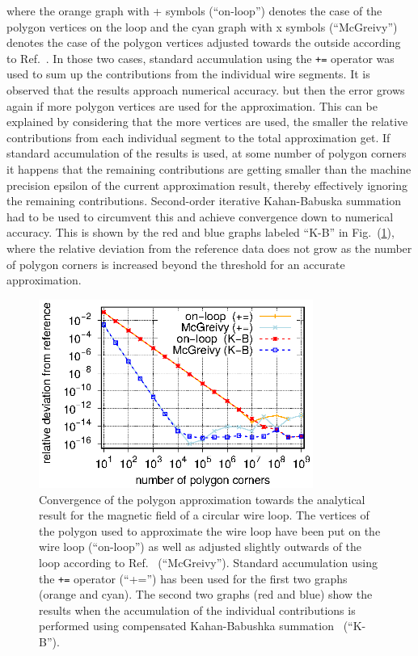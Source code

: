 where the orange graph with + symbols (``on-loop'') denotes the case of the polygon vertices on the loop
and the cyan graph with x symbols (``McGreivy'') denotes the case of the polygon vertices adjusted towards the outside
according to Ref.~\cite{mcgreivy_2021}.
In those two cases, standard accumulation using the \texttt{+=} operator
was used to sum up the contributions from the individual wire segments.
It is observed that the results approach numerical accuracy.
but then the error grows again if more polygon vertices are used for the approximation.
This can be explained by considering that the more vertices are used,
the smaller the relative contributions from each individual segment to the total approximation get.
If standard accumulation of the results is used, at some number of polygon corners
it happens that the remaining contributions are getting smaller than the machine precision epsilon
of the current approximation result, thereby effectively ignoring the remaining contributions.
Second-order iterative Kahan-Babuska summation~\cite{klein_2006} had to be used
to circumvent this and achieve convergence down to numerical accuracy.
This is shown by the red and blue graphs labeled ``K-B'' in Fig.~(\ref{fig:McGreivy_convergence_2}),
where the relative deviation from the reference data does not grow
as the number of polygon corners is increased beyond the threshold for an accurate approximation.
\begin{figure}[htbp]
 \centering
 \includegraphics[width=0.8\textwidth]{img/McGreivy_convergence_2.eps}
 \caption{Convergence of the polygon approximation towards the analytical result for the magnetic field of a circular wire loop.
          The vertices of the polygon used to approximate the wire loop have been put on the wire loop (``on-loop'')
          as well as adjusted slightly outwards of the loop according to Ref.~\cite{mcgreivy_2021} (``McGreivy'').
          Standard accumulation using the \texttt{+=} operator (``+='') has been used for the first two graphs (orange and cyan).
          The second two graphs (red and blue) show the results when the accumulation of the individual contributions
          is performed using compensated Kahan-Babushka summation~\cite{klein_2006} (``K-B'').}
 \label{fig:McGreivy_convergence_2}
\end{figure}

